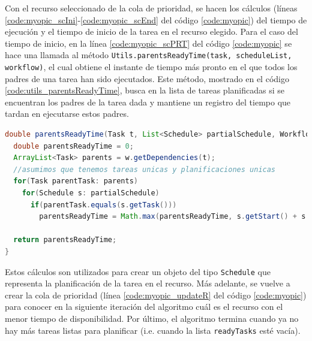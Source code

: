 Con el recurso seleccionado de la cola de prioridad, se hacen los cálculos (líneas \ref{code:myopic_scIni}-\ref{code:myopic_scEnd} del código \ref{code:myopic}) del tiempo de ejecución y el tiempo de inicio de la tarea en el recurso elegido. Para el caso del tiempo de inicio, en la línea \ref{code:myopic_scPRT} del código \ref{code:myopic} se hace una llamada al método \texttt{Utils.parentsReadyTime(task, scheduleList, workflow)}, el cual obtiene el instante de tiempo más pronto en el que todos los padres de una tarea han sido ejecutados. Este método, mostrado en el código \ref{code:utils_parentsReadyTime}, busca en la lista de tareas planificadas si se encuentran los padres de la tarea dada y mantiene un registro del tiempo que tardan en ejecutarse estos padres.

\begin{lstlisting}[language=java,label={code:utils_parentsReadyTime},caption={Método que calcula el tiempo mínimo en el que los padres de una tarea dada han sido ejecutados.},float]
double parentsReadyTime(Task t, List<Schedule> partialSchedule, Workflow w) {
  double parentsReadyTime = 0;
  ArrayList<Task> parents = w.getDependencies(t);
  //asumimos que tenemos tareas unicas y planificaciones unicas
  for(Task parentTask: parents)
    for(Schedule s: partialSchedule)
      if(parentTask.equals(s.getTask()))
        parentsReadyTime = Math.max(parentsReadyTime, s.getStart() + s.getDuration());

  return parentsReadyTime;
}
\end{lstlisting}

Estos cálculos son utilizados para crear un objeto del tipo \texttt{Schedule} que representa la planificación de la tarea en el recurso. Más adelante, se vuelve a crear la cola de prioridad (línea \ref{code:myopic_updateR} del código \ref{code:myopic}) para conocer en la siguiente iteración del algoritmo cuál es el recurso con el menor tiempo de disponibilidad. Por último, el algoritmo termina cuando ya no hay más tareas listas para planificar (i.e. cuando la lista \texttt{readyTasks} esté vacía).


